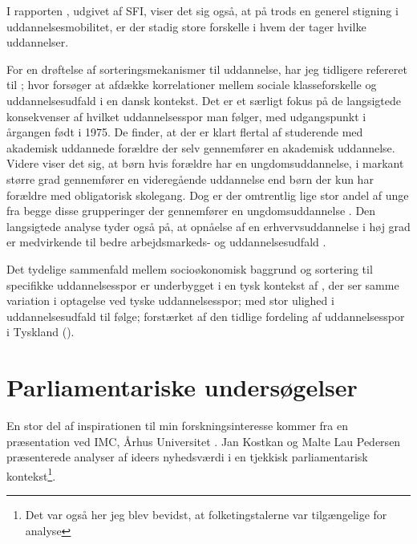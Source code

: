 I rapporten , udgivet af SFI, viser det sig også, at på trods en generel stigning i uddannelsesmobilitet, er der stadig store forskelle i hvem der tager hvilke uddannelser.

For en drøftelse af sorteringsmekanismer til uddannelse, har jeg tidligere refereret til ; hvor \citeauthor{felsbirkelundStructureCausesConsequencesInprogress} forsøger at afdække korrelationer mellem sociale klasseforskelle og uddannelsesudfald i en dansk kontekst.
Det er et særligt fokus på de langsigtede konsekvenser af hvilket uddannelsesspor man følger, med udgangspunkt i årgangen født i 1975.
De finder, at der er klart flertal af studerende med akademisk uddannede forældre der selv gennemfører en akademisk uddannelse.
Videre viser det sig, at børn hvis forældre har en ungdomsuddannelse, i markant større grad gennemfører en videregående uddannelse end børn der kun har forældre med obligatorisk skolegang.
Dog er der omtrentlig lige stor andel af unge fra begge disse grupperinger der gennemfører en ungdomsuddannelse \autocite[s 12]{felsbirkelundStructureCausesConsequencesInprogress}.
Den langsigtede analyse tyder også på, at opnåelse af en erhvervsuddannelse i høj grad er medvirkende til bedre arbejdsmarkeds- og uddannelsesudfald \autocite[s. 24]{felsbirkelundStructureCausesConsequencesInprogress}.

Det tydelige sammenfald mellem socioøkonomisk baggrund og sortering til specifikke uddannelsesspor er underbygget i en tysk kontekst af \citeauthor{schnepfSortingHatThat2002}, der ser samme variation i optagelse ved tyske uddannelsesspor; med stor ulighed i uddannelsesudfald til følge; forstærket af den tidlige fordeling af uddannelsesspor i Tyskland (\citeyear{schnepfSortingHatThat2002}).
 
\section{Parliamentariske undersøgelser}\label{sec:review-parl}

En stor del af inspirationen til min forskningsinteresse kommer fra en præsentation ved IMC, Århus Universitet \autocite{interactingmindscentreaarhusuniversityNLPWorkshopIMC2019}. Jan Kostkan og Malte Lau Pedersen præsenterede analyser af ideers nyhedsværdi i en tjekkisk parliamentarisk kontekst\footnote{Det var også her jeg blev bevidst, at folketingstalerne var tilgængelige for analyse}.

